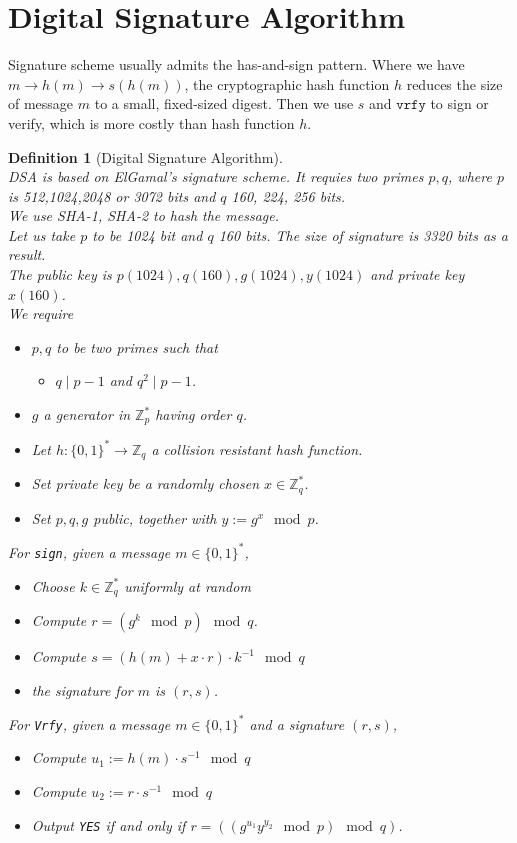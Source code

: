 \documentclass[12pt]{article}
\newtheorem{definition}{Definition}[section]
\theoremstyle{definition}
\begin{document}
\section{Digital Signature Algorithm}
Signature scheme usually admits the has-and-sign pattern. Where we have $m\to h(m)\to s(h(m))$, the cryptographic hash function $h$ reduces the size of message $m$ to a small, fixed-sized digest. Then we use $s$ and $\texttt{vrfy}$ to sign or verify, which is more costly than hash function $h$.
\begin{definition}[Digital Signature Algorithm]
\hfill\\\normalfont DSA is based on ElGamal's signature scheme. It requies two primes $p,q$, where $p$ is 512,1024,2048 or 3072 bits and $q$ 160, 224, 256 bits.\\
We use SHA-1, SHA-2 to hash the message. \\
Let us take $p$ to be 1024 bit and $q$ 160 bits. The size of signature is 3320 bits as a result.\\
The public key is $p(1024), q(160), g(1024), y(1024)$ and private key $x(160)$.\\
We require
\begin{itemize}
  \item $p,q$ to be two primes such that
  \begin{itemize}
    \item $q\mid p-1$ and $q^2\mid p-1$.
  \end{itemize}
  \item $g$ a generator in $\mathbb{Z}_p^\ast$ having order $q$.
  \item Let $h:\{0,1\}^\ast\to\mathbb{Z}_q$ a collision resistant hash function.
  \item Set private key be a \textit{randomly chosen} $x\in\mathbb{Z}_q^\ast$.
  \item Set $p,q,g$ public, together with $y:=g^x\mod p$.
\end{itemize}
For \texttt{sign}, given a message $m\in\{0,1\}^\ast$,
\begin{itemize}
  \item Choose $k\in\mathbb{Z}_q^\ast$ uniformly at random
  \item Compute $r=(g^k\mod p)\mod q$.
  \item Compute $s=(h(m)+x\cdot r)\cdot k^{-1}\mod q$
  \item the signature for $m$ is $(r,s)$.
\end{itemize}
For \texttt{Vrfy}, given a message $m\in\{0,1\}^\ast$ and a signature $(r,s)$,
\begin{itemize}
  \item Compute $u_1:=h(m)\cdot s^{-1}\mod q$
  \item Compute $u_2:=r\cdot s^{-1}\mod q$
  \item Output \texttt{YES} if and only if $r=((g^{u_1}y^{y_2}\mod p)\mod q)$.
\end{itemize}
\end{definition}
\end{document}
